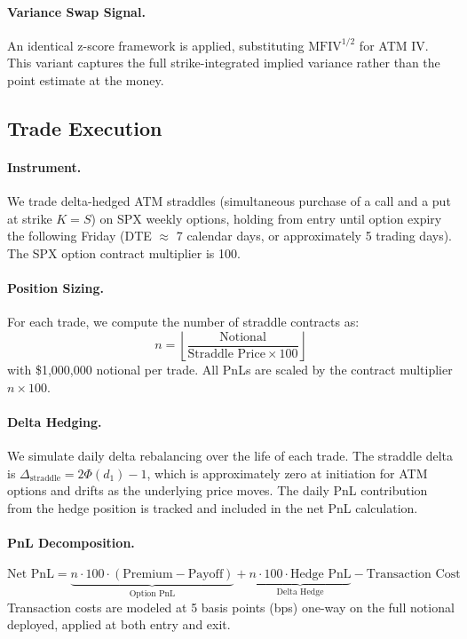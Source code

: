 \documentclass[11pt,a4paper]{article}
\begin{document}
\paragraph{Variance Swap Signal.}
An identical z-score framework is applied, substituting $\text{MFIV}^{1/2}$ for ATM IV.
This variant captures the full strike-integrated implied variance rather than the point estimate at the money.

\subsection{Trade Execution}

\paragraph{Instrument.}
We trade delta-hedged ATM straddles (simultaneous purchase of a call and a put at strike $K = S$) on SPX weekly options, holding from entry until option expiry the following Friday (DTE $\approx$ 7 calendar days, or approximately 5 trading days). The SPX option contract multiplier is 100.

\paragraph{Position Sizing.}
For each trade, we compute the number of straddle contracts as:
\begin{equation}
    n = \left\lfloor \frac{\text{Notional}}{\text{Straddle Price} \times 100} \right\rfloor
\end{equation}
with \$1{,}000{,}000 notional per trade. All PnLs are scaled by the contract multiplier $n \times 100$.

\paragraph{Delta Hedging.}
We simulate daily delta rebalancing over the life of each trade.
The straddle delta is $\Delta_{\text{straddle}} = 2\Phi(d_1) - 1$, which is approximately zero at initiation for ATM options and drifts as the underlying price moves.
The daily PnL contribution from the hedge position is tracked and included in the net PnL calculation.

\paragraph{PnL Decomposition.}
\begin{equation}
    \text{Net PnL} = \underbrace{n \cdot 100 \cdot (\text{Premium} - \text{Payoff})}_{\text{Option PnL}} + \underbrace{n \cdot 100 \cdot \text{Hedge PnL}}_{\text{Delta Hedge}} - {\text{Transaction Cost}}
\end{equation}
Transaction costs are modeled at 5 basis points (bps) one-way on the full notional deployed, applied at both entry and exit.
\end{document}
